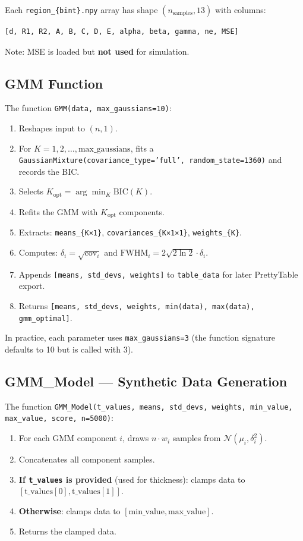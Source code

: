 \documentclass[11pt,a4paper]{article}
\begin{document}
Each {\tt region\_\{bint\}.npy} array has shape $(n_{\text{samples}}, 13)$ with columns:
\begin{verbatim}
[d, R1, R2, A, B, C, D, E, alpha, beta, gamma, ne, MSE]
\end{verbatim}
Note: MSE is loaded but \textbf{not used} for simulation.

\subsection{GMM Function}

The function {\tt GMM(data, max\_gaussians=10)}:

\begin{enumerate}
    \item Reshapes input to $(n, 1)$.
    \item For $K = 1, 2, \dots, \text{max\_gaussians}$, fits a {\tt GaussianMixture(covariance\_type='full', random\_state=1360)} and records the BIC.
    \item Selects $K_{\text{opt}} = \arg\min_K \text{BIC}(K)$.
    \item Refits the GMM with $K_{\text{opt}}$ components.
    \item Extracts: {\tt means\_\{K×1\}}, {\tt covariances\_\{K×1×1\}}, {\tt weights\_\{K\}}.
    \item Computes: $\delta_i = \sqrt{\text{cov}_{i}}$ and $\text{FWHM}_i = 2\sqrt{2\ln 2} \cdot \delta_i$.
    \item Appends {\tt [means, std\_devs, weights]} to {\tt table\_data} for later PrettyTable export.
    \item Returns {\tt [means, std\_devs, weights, min(data), max(data), gmm\_optimal]}.
\end{enumerate}

In practice, each parameter uses {\tt max\_gaussians=3} (the function signature defaults to 10 but is called with 3).

\subsection{GMM\_Model — Synthetic Data Generation}

The function {\tt GMM\_Model(t\_values, means, std\_devs, weights, min\_value, max\_value, score, n=5000)}:

\begin{enumerate}
    \item For each GMM component $i$, draws $n \cdot w_i$ samples from $\mathcal{N}(\mu_i, \delta_i^2)$.
    \item Concatenates all component samples.
    \item \textbf{If {\tt t\_values} is provided} (used for thickness): clamps data to $[\text{t\_values}[0], \text{t\_values}[1]]$.
    \item \textbf{Otherwise}: clamps data to $[\text{min\_value}, \text{max\_value}]$.
    \item Returns the clamped data.
\end{enumerate}
\end{document}
